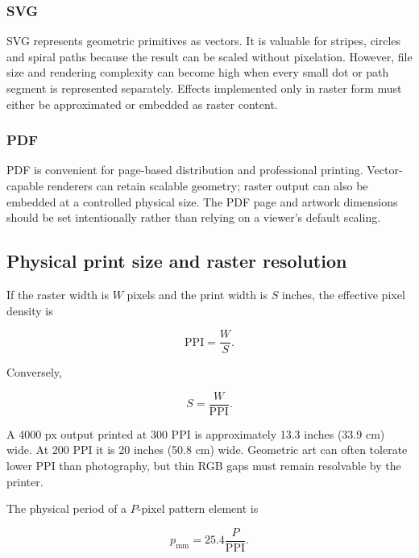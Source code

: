 \subsubsection{SVG}

SVG represents geometric primitives as vectors. It is valuable for stripes, circles and spiral paths because the result can be scaled without pixelation. However, file size and rendering complexity can become high when every small dot or path segment is represented separately. Effects implemented only in raster form must either be approximated or embedded as raster content.

\subsubsection{PDF}

PDF is convenient for page-based distribution and professional printing. Vector-capable renderers can retain scalable geometry; raster output can also be embedded at a controlled physical size. The PDF page and artwork dimensions should be set intentionally rather than relying on a viewer's default scaling.

\subsection{Physical print size and raster resolution}

If the raster width is $W$ pixels and the print width is $S$ inches, the effective pixel density is

\begin{equation}
\mathrm{PPI}=\frac{W}{S}.
\label{eq:ppi}
\end{equation}

Conversely,

\begin{equation}
S=\frac{W}{\mathrm{PPI}}.
\end{equation}

A 4000 px output printed at 300 PPI is approximately 13.3 inches (33.9 cm) wide. At 200 PPI it is 20 inches (50.8 cm) wide. Geometric art can often tolerate lower PPI than photography, but thin RGB gaps must remain resolvable by the printer.

The physical period of a $P$-pixel pattern element is

\begin{equation}
p_{\mathrm{mm}}=25.4\frac{P}{\mathrm{PPI}}.
\label{eq:physicalperiod}
\end{equation}

